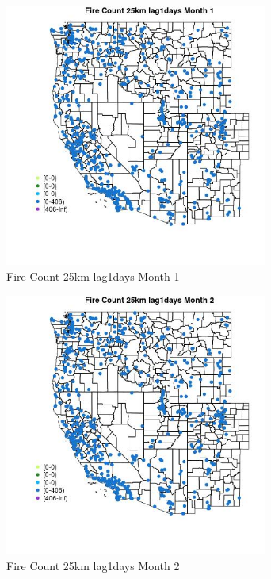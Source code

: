 \begin{figure} 
\centering  
\includegraphics[width=0.77\textwidth]{Code_Outputs/Report_ML_input_PM25_Step4_part_f_de_duplicated_aves_prioritize_24hr_obswNAs_MapObsMo1Fire_Count_25km_lag1days.jpg} 
\caption{\label{fig:Report_ML_input_PM25_Step4_part_f_de_duplicated_aves_prioritize_24hr_obswNAsMapObsMo1Fire_Count_25km_lag1days}Fire Count 25km lag1days Month 1} 
\end{figure} 
 

\begin{figure} 
\centering  
\includegraphics[width=0.77\textwidth]{Code_Outputs/Report_ML_input_PM25_Step4_part_f_de_duplicated_aves_prioritize_24hr_obswNAs_MapObsMo2Fire_Count_25km_lag1days.jpg} 
\caption{\label{fig:Report_ML_input_PM25_Step4_part_f_de_duplicated_aves_prioritize_24hr_obswNAsMapObsMo2Fire_Count_25km_lag1days}Fire Count 25km lag1days Month 2} 
\end{figure} 
 

